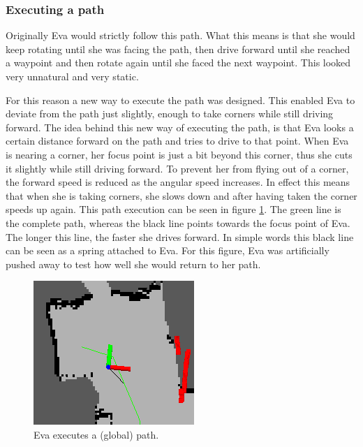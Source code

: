 \documentclass[project_eva.tex]{subfiles}
\begin{document}
\subsubsection*{Executing a path}
Originally Eva would strictly follow this path. What this means is that she would keep rotating until she was facing the path, then drive forward until she reached a waypoint and then rotate again until she faced the next waypoint. This looked very unnatural and very static. 

For this reason a new way to execute the path was designed. This enabled Eva to deviate from the path just slightly, enough 
to take corners while still driving forward. The idea behind this new way of executing the path, is that Eva looks a 
certain distance forward on the path and tries to drive to that point. When Eva is nearing a corner, her focus point is 
just a bit beyond this corner, thus she cuts it slightly while still driving forward. To prevent her from flying out of a 
corner, the forward speed is reduced as the angular speed increases. In effect this means that when she is taking corners, 
she slows down and after having taken the corner speeds up again. This path execution can be seen in figure 
\ref{fig:global_path}. The green line is the complete path, whereas the black line points towards the focus point of Eva. 
The longer this line, the faster she drives forward. In simple words this black line can be seen as a spring attached to 
Eva. For this figure, Eva was artificially pushed away to test how well she would return to her path.
\begin{figure}[ht!]
	\centering
	\mbox{\includegraphics[scale=0.4]{Images/global_path.png}}
	\caption{Eva executes a (global) path.}
	\label{fig:global_path}
\end{figure}
\end{document}
